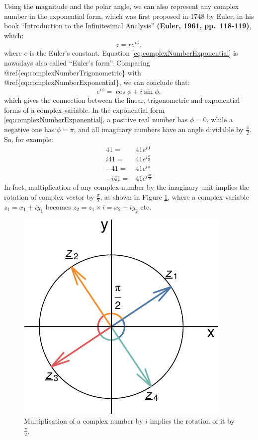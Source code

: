 \documentclass[
]{book}
\begin{document}
Using the magnitude and the polar angle, we can also represent any complex number in the exponential form, which was first proposed in 1748 by Euler, in his book ``Introduction to the Infinitesimal Analysis'' \textbf{(Euler, 1961, pp.~118-119)}, which:
\begin{equation}
    z = r e^{i \phi} ,
    \label{eq:complexNumberExponential}
\end{equation}
where \(e\) is the Euler's constant. Equation \eqref{eq:complexNumberExponential} is nowadays also called ``Euler's form''. Comparing @ref\{eq:complexNumberTrigonometric\} with @ref\{eq:complexNumberExponential\}, we can conclude that:
\begin{equation}
    e^{i \phi} = \cos \phi + i \sin \phi ,
    \label{eq:EulerFormula}
\end{equation}
which gives the connection between the linear, trigonometric and exponential forms of a complex variable. In the exponential form \eqref{eq:complexNumberExponential}, a positive real number has \(\phi=0\), while a negative one has \(\phi=\pi\), and all imaginary numbers have an angle dividable by \(\frac{\pi}{2}\). So, for example:
\begin{equation*}
    \begin{aligned}
    41 = & 41 e^{i 0} \\
    i41 = & 41 e^{i \frac{\pi}{2}} \\
    -41 = & 41 e^{i \pi} \\
    -i41 = & 41 e^{i \frac{3 \pi}{2}}
    \end{aligned}
\end{equation*}
In fact, multiplication of any complex number by the imaginary unit implies the rotation of complex vector by \(\frac{\pi}{2}\), as shown in Figure \ref{fig:complexPlaneMultiplication}, where a complex variable \(z_1 = x_1 + i y_1\) becomes \(z_2 = z_1 \times i = x_2 + i y_2\) etc.

\begin{figure}
\centering
\includegraphics{Svetunkov---Svetunkov---Complex-Dynamic-Models_files/figure-latex/complexPlaneMultiplication-1.pdf}
\caption{\label{fig:complexPlaneMultiplication}Multiplication of a complex number by \(i\) implies the rotation of it by \(\frac{\pi}{2}\).}
\end{figure}
\end{document}
